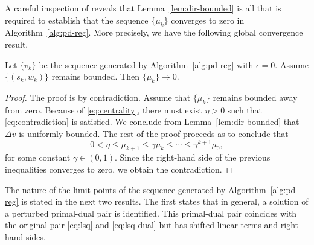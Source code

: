 \documentclass{amsart}
\begin{document}
A careful inspection of \cite[\S$5.2$ and \S$5.4$]{friedlander-orban-2012}
reveals that Lemma~\ref{lem:dir-bounded} is all that is required to establish
that the sequence $\{\mu_k\}$ converges to zero in Algorithm~\ref{alg:pd-reg}.
More precisely, we have the following global convergence result.

\begin{btheorem}
  \label{thm:global-conv}
  Let $\{v_k\}$ be the sequence generated by Algorithm~\ref{alg:pd-reg} with
  $\epsilon = 0$. Assume $\{(s_k, w_k)\}$ remains bounded. Then $\{\mu_k\} \to
  0$.
\end{btheorem}

\begin{proof}
  The proof is by contradiction. Assume that $\{\mu_k\}$ remains bounded away
  from zero. Because of \eqref{eq:centrality}, there must exist $\eta > 0$
  such that \eqref{eq:contradiction} is satisfied. We conclude from
  Lemma~\ref{lem:dir-bounded} that $\Delta v$ is uniformly bounded. The rest of
  the proof proceeds as \cite[Theorem~$5.4$]{friedlander-orban-2012} to
  conclude that
  \[
    0 < \eta \leq \mu_{k+1} \leq \gamma \mu_k \leq \cdots \leq \gamma^{k+1}
    \mu_0,
  \]
  for some constant $\gamma \in (0,1)$. Since the right-hand side of the
  previous inequalities converges to zero, we obtain the contradiction.
\end{proof}

The nature of the limit points of the sequence generated by
Algorithm~\ref{alg:pd-reg} is stated in the next two results. The first states
that in general, a solution of a perturbed primal-dual pair is identified. This
primal-dual pair coincides with the original pair \eqref{eq:lsq} and
\eqref{eq:lsq-dual} but has shifted linear terms and right-hand sides.
\end{document}

